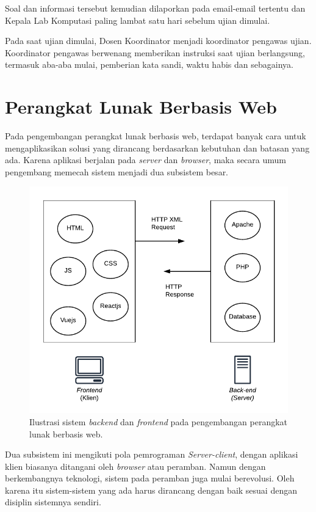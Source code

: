     Soal dan informasi tersebut kemudian dilaporkan pada email-email tertentu
    dan Kepala Lab Komputasi paling lambat satu hari sebelum ujian dimulai.

    Pada saat ujian dimulai, Dosen Koordinator menjadi koordinator pengawas
    ujian. Koordinator pengawas berwenang memberikan instruksi saat ujian
    berlangsung, termasuk aba-aba mulai, pemberian kata sandi, waktu habis dan
    sebagainya.

\section{Perangkat Lunak Berbasis Web}
    Pada pengembangan perangkat lunak berbasis web, terdapat
    banyak cara untuk mengaplikasikan solusi yang dirancang berdasarkan
    kebutuhan dan batasan yang ada. Karena
    aplikasi berjalan pada \textit{server} dan \textit{browser}, maka
    secara umum pengembang memecah sistem menjadi dua subsistem besar.
    
    \begin{figure}
        \centering
        \includegraphics{Gambar/Illustration - frontend-backend.pdf}
        \caption{Ilustrasi sistem \textit{backend} dan \textit{frontend} pada pengembangan 
            perangkat lunak berbasis web.}
        \label{fig:illust-web}
    \end{figure}
    
    Dua subsistem ini mengikuti pola pemrograman \textit{Server-client}, dengan
    aplikasi klien biasanya ditangani oleh \textit{browser} atau peramban. Namun
    dengan berkembangnya teknologi, sistem pada peramban juga mulai berevolusi.
    Oleh karena itu sistem-sistem yang ada harus dirancang dengan baik sesuai
    dengan disiplin sistemnya sendiri.
    
